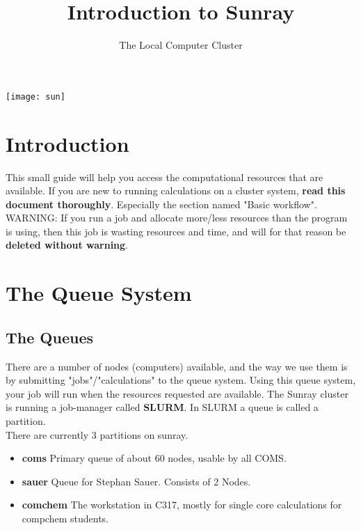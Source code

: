 \documentclass{article}
\title{Introduction to Sunray}
\author{The Local Computer Cluster}
\date{}
\begin{document}

\maketitle

\begin{center}
    \texttt{[image: sun]}
\end{center}

\tableofcontents


\newpage


\section{Introduction}

This small guide will help you access the computational resources that are available.
If you are new to running calculations on a cluster system, {\bf read this document thoroughly}.
Especially the section named "Basic workflow".\\

WARNING: If you run a job and allocate more/less resources than the program is using, then this job is wasting resources and time, and will for that reason be {\bf deleted without warning}.


\newpage
\section{The Queue System}

\subsection*{The Queues}

There are a number of nodes (computers) available, and the way we use them is by submitting "jobs"/"calculations" to the queue system.
%
Using this queue system, your job will run when the resources requested are available.
The Sunray cluster is running a job-manager called {\bf SLURM}.
In SLURM a queue is called a partition.\\

There are currently 3 partitions on sunray.

\begin{itemize}
    \item {\bf coms} Primary queue of about 60 nodes, usable by all COMS. \newline

    \item {\bf sauer} Queue for Stephan Sauer. Consists of 2 Nodes. \newline

    \item {\bf comchem} The workstation in C317, mostly for single core calculations for compchem students.

\end{itemize}
\end{document}
